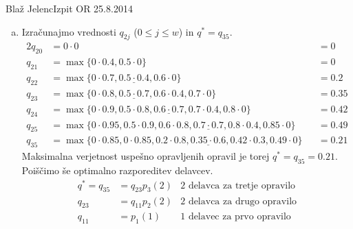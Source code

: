 \begin{naloga}{Blaž Jelenc}{Izpit OR 25.8.2014}
\begin{odgovor}
\begin{enumerate}[(a)]
\item Izračunajmo vrednosti $q_{2j}$ ($0 \le j \le w$) in $q^* = q_{35}$.
\begin{alignat*}{2}
q_{20} &= 0 \cdot 0 &&= 0 \\
q_{21} &= \max\{0 \cdot 0.4, 0.5 \cdot 0\} &&= 0 \\
q_{22} &= \max\{0 \cdot 0.7, \underline{0.5 \cdot 0.4}, 0.6 \cdot 0\} &&= 0.2 \\
q_{23} &= \max\{0 \cdot 0.8, \underline{0.5 \cdot 0.7}, 0.6 \cdot 0.4, 0.7 \cdot 0\} &&= 0.35 \\
q_{24} &= \max\{0 \cdot 0.9, 0.5 \cdot 0.8, \underline{0.6 \cdot 0.7}, 0.7 \cdot 0.4, 0.8 \cdot 0\} &&= 0.42 \\
q_{25} &= \max\{0 \cdot 0.95, 0.5 \cdot 0.9, 0.6 \cdot 0.8, \underline{0.7 \cdot 0.7}, 0.8 \cdot 0.4, 0.85 \cdot 0\} &&= 0.49 \\
q_{35} &= \max\{0 \cdot 0.85, 0 \cdot 0.85, 0.2 \cdot 0.8, \underline{0.35 \cdot 0.6}, 0.42 \cdot 0.3, 0.49 \cdot 0\} &&= 0.21
\end{alignat*}
Maksimalna verjetnost uspešno opravljenih opravil
je torej $q^* = q_{35} = 0.21$.
Poiščimo še optimalno razporeditev delavcev.
\begin{align*}
q^* = q_{35} &= q_{23} p_3(2) & \text{$2$ delavca za tretje opravilo} \\
q_{23} &= q_{11} p_2(2) & \text{$2$ delavca za drugo opravilo} \\
q_{11} &= p_1(1) & \text{$1$ delavec za prvo opravilo}
\end{align*}
\end{enumerate}
\end{odgovor}
\end{naloga}
